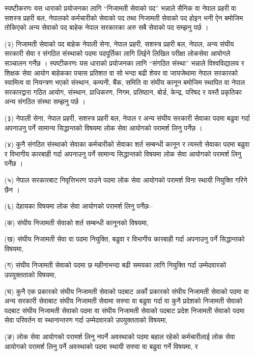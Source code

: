 स्पष्टीकरणः यस धाराको प्रयोजनका लागि “निजामती सेवाको पद” भन्नाले सैनिक वा नेपाल प्रहरी वा सशस्त्र प्रहरी बल, नेपालको कर्मचारीको सेवाको पद तथा निजामती सेवाको पद होइन भनी ऐन बमोजिम तोकिएको अन्य सेवाको पद बाहेक नेपाल सरकारका अरु सबै सेवाको पद सम्झनु पर्छ ।

(२) निजामती सेवाको पद बाहेक नेपाली सेना, नेपाल प्रहरी, सशस्त्र प्रहरी बल, नेपाल, अन्य संघीय सरकारी सेवा र संगठित संस्थाको पदमा
पदपूर्तिका लागि लिईने लिखित परीक्षा लोकसेवा आयोगले सञ्चालन गर्नेछ ।
स्पष्टीकरणः यस धाराको प्रयोजनका लागि “संगठित संस्था” भन्नाले विश्वविद्यालय र शिक्षक सेवा आयोग बाहेकका पचास प्रतिशत वा सो भन्दा बढी शेयर वा जायजेथामा नेपाल सरकारको स्वामित्व वा नियन्त्रण भएको संस्थान, कम्पनी, बैंक, समिति वा संघीय कानून बमोजिम स्थापित वा नेपाल सरकारद्वारा गठित आयोग, संस्थान, प्राधिकरण, निगम, प्रतिष्ठान, बोर्ड, केन्द्र, परिषद र यस्तै प्रकृतिका अन्य संगठित संस्था सम्झनु पर्छ ।

(३) नेपाली सेना, नेपाल प्रहरी, सशस्त्र प्रहरी बल, नेपाल र अन्य संघीय सरकारी सेवाका पदमा बढुवा गर्दा अपनाउनु पर्ने सामान्य सिद्धान्तको विषयमा लोक सेवा आयोगको परामर्श लिनु पर्नेछ ।

(४) कुनै संगठित संस्थाको सेवाका कर्मचारीको सेवाका शर्त सम्बन्धी कानून र त्यस्तो सेवाका पदमा बढुवा र विभागीय कारबाही गर्दा अपनाउनु पर्ने सामान्य सिद्धान्तको विषयमा लोक सेवा आयोगको परामर्श लिनु पर्नेछ ।

(५) नेपाल सरकारबाट निवृत्तिभरण पाउने पदमा लोक सेवा आयोगको परामर्श विना स्थायी नियुक्ति गरिने छैन ।

(६) देहायका विषयमा लोक सेवा आयोगको परामर्श लिनु पर्नेछः–

(क) संघीय निजामती सेवाको शर्त सम्बन्धी कानूनको विषयमा,

(ख) संघीय निजामती सेवा वा पदमा नियुक्ति, बढुवा र विभागीय कारबाही गर्दा अपनाउनु पर्ने सिद्धान्तको विषयमा,

(ग) संघीय निजामती सेवाको पदमा छ महीनाभन्दा बढी समयका लागि नियुक्ति गर्दा उम्मेदवारको उपयुक्तताको विषयमा,

(घ) कुनै एक प्रकारको संघीय निजामती सेवाको पदबाट अर्को प्रकारको संघीय निजामती सेवाको पदमा वा अन्य सरकारी सेवाबाट संघीय निजामती सेवामा सरुवा वा बढुवा गर्दा वा कुनै प्रदेशको निजामती सेवाको पदबाट संघीय निजामती सेवाको पदमा वा संघीय निजामती सेवाको पदबाट प्रदेश निजामती सेवाको पदमा सेवा परिवर्तन वा स्थानान्तरण गर्दा उम्मेदवारको उपयुक्तताको विषयमा,

(ङ) लोक सेवा आयोगको परामर्श लिनु नपर्ने अवस्थाको पदमा बहाल रहेको कर्मचारीलाई लोक सेवा आयोगको परामर्श लिनु
पर्ने अवस्थाको पदमा स्थायी सरुवा वा बढुवा गर्ने विषयमा, र

